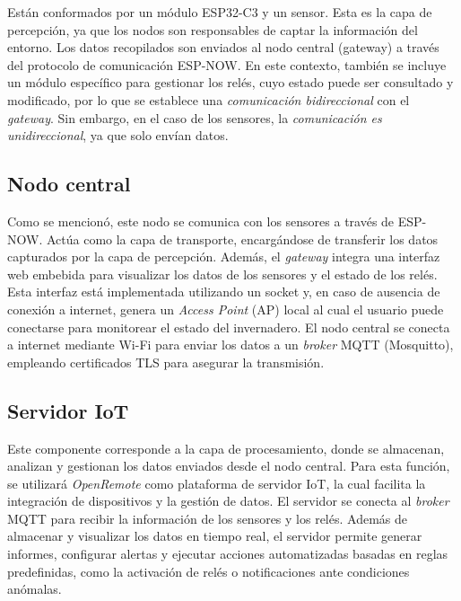 Están conformados por un módulo ESP32-C3 y un sensor. Esta es la capa de percepción, ya que los nodos son responsables de captar la información del entorno. Los datos recopilados son enviados al nodo central (gateway) a través del protocolo de comunicación ESP-NOW. En este contexto, también se incluye un módulo específico para gestionar los relés, cuyo estado puede ser consultado y modificado, por lo que se establece una \textit{comunicación bidireccional} con el \textit{gateway}. Sin embargo, en el caso de los sensores, la \textit{comunicación es unidireccional}, ya que solo envían datos.

\subsection{Nodo central}

Como se mencionó, este nodo se comunica con los sensores a través de ESP-NOW. Actúa como la capa de transporte, encargándose de transferir los datos capturados por la capa de percepción. Además, el \textit{gateway} integra una interfaz web embebida para visualizar los datos de los sensores y el estado de los relés. Esta interfaz está implementada utilizando un socket y, en caso de ausencia de conexión a internet, genera un \textit{Access Point} (AP) local al cual el usuario puede conectarse para monitorear el estado del invernadero. El nodo central se conecta a internet mediante Wi-Fi para enviar los datos a un \textit{broker} MQTT (Mosquitto), empleando certificados TLS para asegurar la transmisión.

\subsection{Servidor IoT}

Este componente corresponde a la capa de procesamiento, donde se almacenan, analizan y gestionan los datos enviados desde el nodo central. Para esta función, se utilizará \textit{OpenRemote} como plataforma de servidor IoT, la cual facilita la integración de dispositivos y la gestión de datos. El servidor se conecta al \textit{broker} MQTT para recibir la información de los sensores y los relés.
Además de almacenar y visualizar los datos en tiempo real, el servidor permite generar informes, configurar alertas y ejecutar acciones automatizadas basadas en reglas predefinidas, como la activación de relés o notificaciones ante condiciones anómalas.



